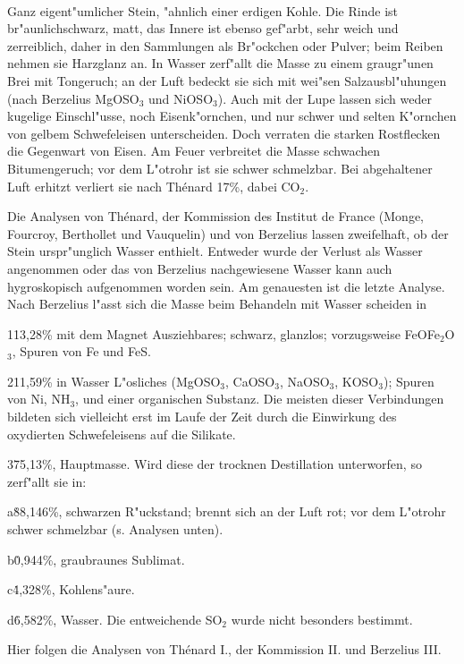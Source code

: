 \documentclass[a4paper, 11pt, oneside]{article}
\begin{document}
\paragraph{}
Ganz eigent"umlicher Stein, "ahnlich einer erdigen Kohle. Die Rinde ist br"aunlichschwarz, matt, das Innere ist ebenso gef"arbt, sehr weich und zerreiblich, daher in den Sammlungen als Br"ockchen oder Pulver; beim Reiben nehmen sie Harzglanz an. In Wasser zerf"allt die Masse zu einem graugr"unen Brei mit Tongeruch; an der Luft bedeckt sie sich mit wei"sen Salzausbl"uhungen (nach Berzelius MgOSO$_{3}$ und NiOSO$_{3}$). Auch mit der Lupe lassen sich weder kugelige Einschl"usse, noch Eisenk"ornchen, und nur schwer und selten K"ornchen von gelbem Schwefeleisen unterscheiden. Doch verraten die starken Rostflecken die Gegenwart von Eisen. Am Feuer verbreitet die Masse schwachen Bitumengeruch; vor dem L"otrohr ist sie schwer schmelzbar. Bei abgehaltener Luft erhitzt verliert sie nach Thénard 17\%, dabei CO$_{2}$.

Die Analysen von Thénard, der Kommission des Institut de France (Monge, Fourcroy, Berthollet und Vauquelin) und von Berzelius lassen zweifelhaft, ob der Stein urspr"unglich Wasser enthielt. Entweder wurde der Verlust als Wasser angenommen oder das von Berzelius nachgewiesene Wasser kann auch hygroskopisch aufgenommen worden sein. Am genauesten ist die letzte Analyse. Nach Berzelius l"asst sich die Masse beim Behandeln mit Wasser scheiden in

1\. 13,28\% mit dem Magnet Ausziehbares; schwarz, glanzlos; vorzugsweise FeOFe$_{2}$O$_{3}$, Spuren von Fe und FeS.

2\. 11,59\% in Wasser L"osliches (MgOSO$_{3}$, CaOSO$_{3}$, NaOSO$_{3}$, KOSO$_{3}$); Spuren von Ni, NH$_{3}$, und einer organischen Substanz. Die meisten dieser Verbindungen bildeten sich vielleicht erst im Laufe der Zeit durch die Einwirkung des oxydierten Schwefeleisens auf die Silikate.

3\. 75,13\%, Hauptmasse. Wird diese der trocknen Destillation unterworfen, so zerf"allt sie in:

a\. 88,146\%, schwarzen R"uckstand; brennt sich an der Luft rot; vor dem L"otrohr schwer schmelzbar (s. Analysen unten).

b\. 0,944\%, graubraunes Sublimat.

c\. 4,328\%, Kohlens"aure.

d\. 6,582\%, Wasser. Die entweichende SO$_{2}$ wurde nicht besonders bestimmt.

Hier folgen die Analysen von Thénard I., der Kommission II. und Berzelius III.
\end{document}
